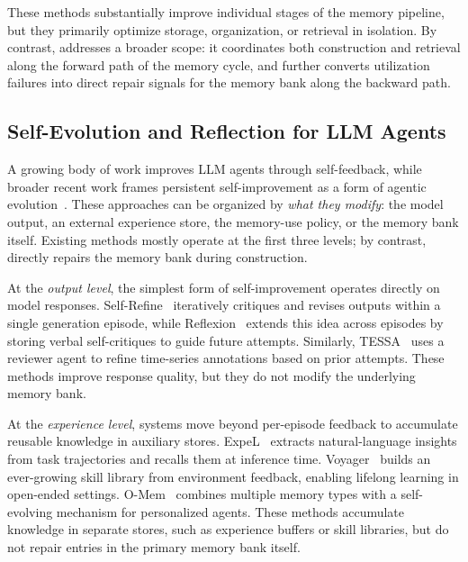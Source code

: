These methods substantially improve individual stages of the memory pipeline, but they primarily optimize storage, organization, or retrieval in isolation.
By contrast, \method addresses a broader scope: it coordinates both construction and retrieval along the forward path of the memory cycle, and further converts utilization failures into direct repair signals for the memory bank along the backward path.

\subsection{Self-Evolution and Reflection for LLM Agents}
\label{appendix:self_evolve_LLM_related_works}

A growing body of work improves LLM agents through self-feedback, while broader recent work frames persistent self-improvement as a form of agentic evolution~\cite{lin2026position}.
These approaches can be organized by \emph{what they modify}: the model output, an external experience store, the memory-use policy, or the memory bank itself.
Existing methods mostly operate at the first three levels; by contrast, \method directly repairs the memory bank during construction.

At the \emph{output level}, the simplest form of self-improvement operates directly on model responses.
Self-Refine~\cite{madaan2023self} iteratively critiques and revises outputs within a single generation episode, while Reflexion~\cite{shinn2023reflexion} extends this idea across episodes by storing verbal self-critiques to guide future attempts.
Similarly, TESSA~\cite{lin2024decoding} uses a reviewer agent to refine time-series annotations based on prior attempts.
These methods improve response quality, but they do not modify the underlying memory bank.

At the \emph{experience level}, systems move beyond per-episode feedback to accumulate reusable knowledge in auxiliary stores.
ExpeL~\cite{zhao2024expel} extracts natural-language insights from task trajectories and recalls them at inference time.
Voyager~\cite{wang2023voyager} builds an ever-growing skill library from environment feedback, enabling lifelong learning in open-ended settings.
O-Mem~\cite{wang2025mem} combines multiple memory types with a self-evolving mechanism for personalized agents.
These methods accumulate knowledge in separate stores, such as experience buffers or skill libraries, but do not repair entries in the primary memory bank itself.

